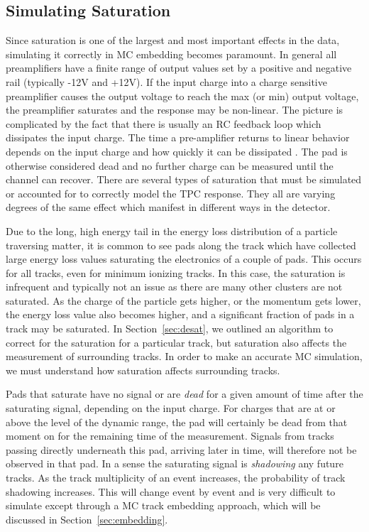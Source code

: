 \subsection{Simulating Saturation}
\label{sec:simSat}

Since saturation is one of the largest and most important effects in the data, simulating it correctly in MC embedding becomes paramount. In general all preamplifiers have a finite range of output values set by a positive and negative rail (typically -12V and +12V). If the input charge into a charge sensitive preamplifier causes the output voltage to reach the max (or min) output voltage, the preamplifier saturates and the response may be non-linear. The picture is complicated by the fact that there is usually an RC feedback loop which dissipates the input charge. The time a pre-amplifier returns to linear behavior depends on the input charge and how quickly it can be dissipated \cite{akiGET}. The pad is otherwise considered dead and no further charge can be measured until the channel can recover. There are several types of saturation that must be simulated or accounted for to correctly model the TPC response. They all are varying degrees of the same effect which manifest in different ways in the detector. 
 
Due to the long, high energy tail in  the energy loss distribution of a particle traversing matter, it is common to see pads along the track which have collected large energy loss values saturating the electronics of a couple of pads. This occurs for all tracks, even for minimum ionizing tracks. In this case, the saturation is infrequent and typically not an issue as there are many other clusters are not saturated. As the charge of the particle gets higher, or the momentum gets lower, the  energy loss value also becomes higher, and a significant fraction of pads in a track may be saturated. In Section~\ref{sec:desat}, we outlined an algorithm to correct for the saturation for a  particular track, but saturation also affects the measurement of surrounding tracks. In order to make an accurate MC simulation, we must understand how saturation affects surrounding tracks. 

Pads that saturate have no signal or are \emph{dead} for a given amount of time after the saturating signal, depending on the input charge. For charges that are at or above the level of the dynamic range, the pad will certainly be dead from that moment on for the remaining time of the measurement. Signals from tracks passing directly underneath this pad, arriving later in time,  will therefore not be observed in that pad. In a sense the saturating signal is \emph{shadowing} any future tracks. As the track multiplicity of an event increases, the probability of track shadowing increases. This will change event by event and is very difficult to simulate except through a MC track embedding approach, which will be discussed in Section~\ref{sec:embedding}. 

